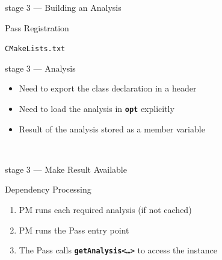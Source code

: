 \documentclass[14pt]{beamer}
\newcommand{\Command}[1]{\textbf{\texttt{#1}}}
\newcommand{\Code}[1]{\textbf{\texttt{#1}}}
\begin{document}
    \begin{frame}[containsverbatim]{stage 3 --- Building an Analysis}
        \begin{alertblock}{Pass Registration}
        {
        \scriptsize
        
        }
        \end{alertblock}

        \begin{block}{\texttt{CMakeLists.txt}}
        {
        \footnotesize
        
        }
        \end{block}

    \end{frame}

    \begin{frame}[containsverbatim]{stage 3 --- Analysis}

        \begin{itemize}
            \item Need to export the class declaration in a header
            \item Need to load the analysis in \Command{opt} explicitly
            \item Result of the analysis stored as a member variable
        \end{itemize}

        \\
        {
        \footnotesize
        
        }
    \end{frame}

    \begin{frame}[containsverbatim]{stage 3 --- Make Result Available}
        \begin{alertblock}{Dependency Processing}
            \begin{enumerate}
                \item PM runs each required analysis (if not cached)
                \item PM runs the Pass entry point
                \item The Pass calls \Code{getAnalysis<\dots>} to access the instance
            \end{enumerate}
        \end{alertblock}
    \end{frame}
\end{document}
